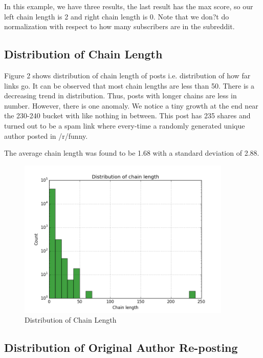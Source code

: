 \documentclass{article} %
\begin{document}
In this example, we have three results, the last result has the max score, so our left chain length is 2 and right chain length is 0.  Note that we don?t do normalization with respect to how many subscribers are in the subreddit.



\subsection{Distribution of Chain Length}

Figure 2 shows distribution of chain length of posts i.e. distribution of how far links go. It can be observed that most chain lengths are less than 50. There is a decreasing trend in distribution. Thus, posts with longer chains are less in number. However, there is one anomaly. We notice a tiny growth at the end near the 230-240 bucket with like nothing in between. This post has 235 shares and turned out to be a spam link where every-time a randomly generated unique author posted in /r/funny.

The average chain length was found to be 1.68 with a standard deviation of 2.88.

\begin{figure}[h]
\begin{center}
\includegraphics[width=4.0in]{lengths.png}
\caption{Distribution of Chain Length}
\end{center}
\end{figure}


\subsection{Distribution of Original Author Re-posting}
\end{document}
